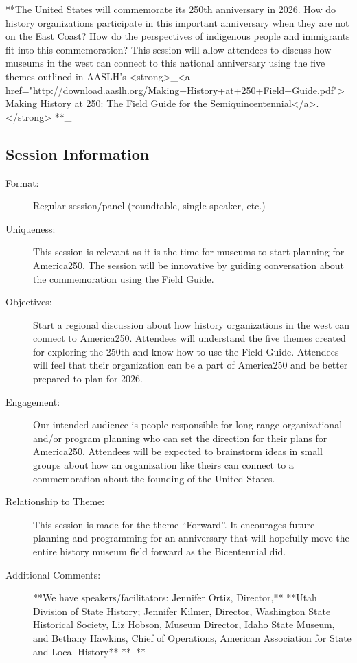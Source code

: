 \documentclass{report}
\begin{document}
              **The United States will commemorate its 250th anniversary in 2026. How do history organizations participate in this important anniversary when they are not on the East Coast? How do the perspectives of indigenous people and immigrants fit into this commemoration? This session will allow attendees to discuss how museums in the west can connect to this national anniversary using the five themes outlined in AASLH’s <strong>\_<a href="http://download.aaslh.org/Making+History+at+250+Field+Guide.pdf">Making History at 250: The Field Guide for the Semiquincentennial</a>.</strong> **\_

              \subsection*{Session Information}
                \begin{description}
                  \item [Format:] Regular session/panel (roundtable, single speaker, etc.)
							    
							    \item [Uniqueness:]This session is relevant as it is the time for museums to start planning for America250. The session will be innovative by guiding conversation about the commemoration using the Field Guide.
							    \item [Objectives:]Start a regional discussion about how history organizations in the west can connect to America250.
Attendees will understand the five themes created for exploring the 250th and know how to use the Field Guide.
Attendees will feel that their organization can be a part of America250 and be better prepared to plan for 2026.
							    \item [Engagement:]Our intended audience is people responsible for long range organizational and/or program planning who can set the direction for their plans for America250. Attendees will be expected to brainstorm ideas in small groups about how an organization like theirs can connect to a commemoration about the founding of the United States.
							    \item [Relationship to Theme:]This session is made for the theme “Forward”. It encourages future planning and programming for an anniversary that will hopefully move the entire history museum field forward as the Bicentennial did.
							    
                    \item [Additional Comments: ] **We have speakers/facilitators: Jennifer Ortiz, Director,** **Utah Division of State History; Jennifer Kilmer, Director, Washington State Historical Society, Liz Hobson, Museum Director, Idaho State Museum, and Bethany Hawkins, Chief of Operations, American Association for State and Local History**
** **
  

                \end{description}
\end{document}
